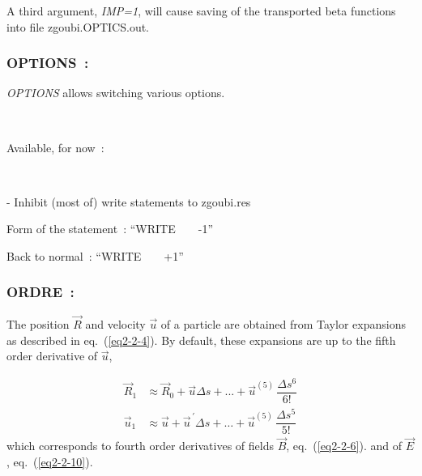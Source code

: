 \bigskip

\noindent A third argument, \textsl{IMP=1}, will cause saving of the transported beta functions into 
file zgoubi.OPTICS.out.








\newpage

\subsubsection*{OPTIONS~: \OPTIONSTitl} \label{OPTIONS} 

\medskip

\textsl{OPTIONS} allows switching various options. 

~

\noindent Available, for now~: 

~

\noindent - Inhibit (most of) write statements to zgoubi.res

Form of the statement~: ``WRITE ~ ~   -1''

Back to normal~: ``WRITE ~ ~  +1''










 \newpage

\subsubsection*{ORDRE~: \ORDRETitl } \label{ORDRE} 
\medskip

 The position $ \vec  R $ and velocity $ \vec  u $ of a particle are
obtained from Taylor expansions as described in eq.~(\ref{eq2-2-4}). By default, these 
expansions are up to the fifth order derivative of $ \vec  u$, 

\begin{align*}
	\vec  R_1 
	     & \approx  \vec  R_0 + \vec  u \Delta s +...+ \vec u^{(5)} \, \dfrac{\Delta s^6 }{ 6!} \\
	\vec  u_1 
	     & \approx  \vec  u + \vec  u^{\,\prime} \Delta s  
	        + \ldots + \vec  u^{(5)}\, \dfrac{\Delta s^5 }{ 5!}   
\end{align*}
%
 which corresponds to fourth order derivatives of fields $ \vec  B $, eq.~(\ref{eq2-2-6}).
 and of $ \vec  E $, eq.~(\ref{eq2-2-10}). 

